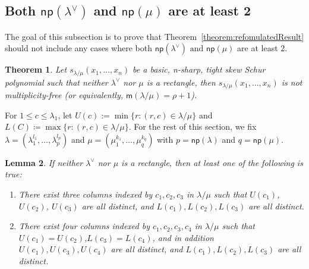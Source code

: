 \documentclass[10pt]{article}
\newtheorem{theorem}{Theorem}[section]
\newtheorem{lemma}[theorem]{Lemma}
\theoremstyle{definition}
\newcommand{\np}{\mathsf{np}}
\newcommand{\msf}{\mathsf{m}}
\begin{document}
\subsection{Both \texorpdfstring{$\np (\lambda^\vee)$}{np(lambda vee)} and \texorpdfstring{$\np (\mu)$}{np(mu)} are at least 2}

The goal of this subsection is to prove that Theorem~\ref{theorem:refomulatedResult} should not include any cases where both $\np (\lambda^\vee) \text{ and }\np (\mu)$ are at least 2.

\begin{theorem}
\label{thm:lambdamunotrectangle}
Let $s_{\lambda/\mu}(x_1,\ldots,x_n)$ be a basic, n-sharp, tight skew Schur polynomial such that neither $\lambda^\vee$ nor $\mu$ is a rectangle, then $s_{\lambda/\mu}(x_1,\ldots,x_n)$ is not multiplicity-free (or equivalently, $\msf (\lambda/\mu) = \rho+1$).
\end{theorem}

For $1 \leq c \leq \lambda_1$, let $U(c) := \min\{r:(r,c)\in \lambda / \mu\}$ and $L(C) \coloneqq \max\{r:(r,c)\in \lambda / \mu\}$. For the rest of this section, we fix $\lambda = (\lambda_1^{l_1},\dots, \lambda_p^{l_p})$ and $\mu = (\mu_1^{k_1},\dots, \mu_q^{k_q})$ with $p = \np (\lambda)$ and $q = \np (\mu)$.


\begin{lemma}
\label{lem:nonrect}
 If neither $\lambda^\vee$ nor $\mu$ is a rectangle, then at least one of the following is true:
 \begin{enumerate}[label=(\Roman{*})]
 \item\label{lemma3.4_1} There exist three columns indexed by $c_1,c_2,c_3$ in $\lambda/\mu$ such that $U(c_1)$, $U(c_2)$, $U(c_3)$ are all distinct, and $L(c_1),L(c_2),L(c_3)$ are all distinct.
 \item\label{lemma3.4_2} There exist four columns indexed by $c_1,c_2,c_3,c_4$ in $\lambda/\mu$ such that $U(c_1)=U(c_2)$,$L(c_3)=L(c_4)$, and in addition $U(c_1),U(c_3),U(c_4)$ are all distinct, and $L(c_1),L(c_2),L(c_3)$ are all distinct.
 \end{enumerate}
\end{lemma}
\end{document}
